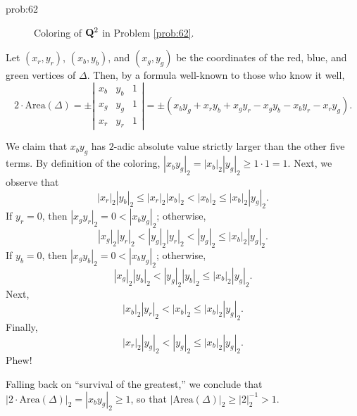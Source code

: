 \begin{sol}{prob:62}
\begin{figure}[t]
\centering
{}
\caption*{Coloring of $\mathbf{Q}^2$ in Problem \ref{prob:62}.}
\end{figure}
 Let $(x_r,y_r)$, $(x_b,y_b)$, and $(x_g, y_g)$ be the coordinates of the red, blue, and green vertices of $\Delta$. Then, by a formula  well-known to those who know it well,
\[ 2 \cdot \text{Area}(\Delta) = \pm \left|
\begin{matrix}
 x_b & y_b & 1 \\
x_g & y_g & 1 \\
x_r & y_r & 1
\end{matrix}
\right| = \pm (x_b y_g + x_r y_b + x_g y_r - x_g y_b - x_b y_r - x_r y_g).\]


We claim that $x_b y_g$ has $2$-adic absolute value strictly larger than the other five terms. By definition of the coloring, $|x_b y_g|_2 = |x_b|_{2} |y_g|_{2}\ge 1 \cdot 1 = 1$. Next, we observe that
\[ |x_r|_2 |y_b|_2 \le |x_r|_2 |x_b|_2 < |x_b|_2 \le |x_b|_2 |y_g|_2.  \]
If $y_r=0$, then $|x_g y_r|_2 = 0 < |x_b y_g|_2$; otherwise, 
\[  |x_g|_2 |y_r|_2 < |y_g|_2 |y_r|_2 < |y_g|_2 \le |x_b|_2 |y_g|_2. \]
If $y_b=0$, then $|x_g y_b|_2 = 0 < |x_b y_g|_2$; otherwise,
\[ |x_g|_2 |y_b|_{2} < |y_g|_{2} |y_b|_{2} \le |x_b|_2 |y_g|_{2}. \]
Next,
\[ |x_b|_2 |y_r|_{2} < |x_b|_2  \le |x_b|_2 |y_g|_{2}. \]
Finally, 
\[ |x_r|_2 |y_g|_2 < |y_g|_2 \le |x_b|_2 |y_g|_2.\]
Phew! 

Falling back on ``survival of the greatest,'' we conclude that $|2 \cdot\textrm{Area}(\Delta)|_{2} = |x_b y_g|_{2} \ge 1$, so that $|\textrm{Area}(\Delta)|_2 \ge |2|_2^{-1} > 1$.
\end{sol}


